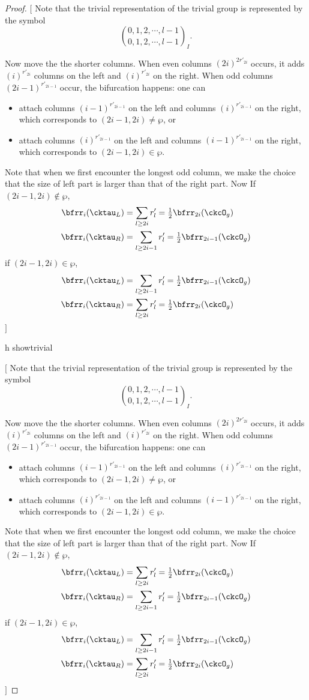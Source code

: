 \documentclass[12pt,a4paper]{amsart}
\newcommand{\trivial}[2][]{\if\relax\detokenize{#1}\relax
  {%
      \color{orange} \vspace{0em} $[$  #2 $]$
      \color{black}
  }
  \else
\ifx#1h
\ifcsname showtrivial\endcsname
{%
    \color{orange} \vspace{0em}  $[$ #2 $]$
    \color{black}
}
\fi
\else {\red Wrong argument!} \fi
\fi
}
\numberwithin{equation}{section}
\theoremstyle{remark}
\def\half{{\tfrac{1}{2}}}
\def\sP{\wp}
\begin{document}
\begin{proof}
  \trivial[]{
  Note that the trivial representation of the trivial group is represented by the symbol
  \[
    \binom{0,1, 2, \cdots, l-1}{0,1,2, \cdots, l-1}_{I}.
  \]

  Now move the the shorter columns. When even columns
  $(2i)^{2r'_{2i}}$ occurs, it adds $(i)^{r'_{2i}}$ columns on the left
  and $(i)^{r'_{2i}}$ on the right.
  When odd columns $(2i-1)^{r'_{2i-1}}$ occur,  the bifurcation
  happens: one can
  \begin{itemize}
    \item attach columns $(i-1)^{r'_{2i-1}}$ on the left and
    columns $(i)^{r'_{2i-1}}$ on the right, which corresponds to
    $(2i-1,2i)\neq \sP$, or
    \item
    attach columns $(i)^{r'_{2i-1}}$ on the left and
    columns $(i-1)^{r'_{2i-1}}$ on the right, which corresponds to
    $(2i-1,2i)\in \sP$.
  \end{itemize}
  Note that when we first encounter the longest odd column, we make the choice
  that the size of left part is larger than that of the right part.
  Now
  If $(2i-1,2i)\notin \sP$,
  \[
    \begin{split}
      \bfrr_{i}(\cktau_{L}) & = \sum_{l\geq 2i} r'_{l}
      = \half\bfrr_{2i}(\ckcO_{g})\\
      \bfrr_{i}(\cktau_{R}) & = \sum_{l\geq 2i-1} r'_{l}
      = \half\bfrr_{2i-1}(\ckcO_{g})
    \end{split}
  \]
  if $(2i-1,2i)\in \sP$,
  \[
    \begin{split}
      \bfrr_{i}(\cktau_{L}) & = \sum_{l\geq 2i-1} r'_{l}
      = \half\bfrr_{2i-1}(\ckcO_{g})\\
      \bfrr_{i}(\cktau_{R}) & = \sum_{l\geq 2i} r'_{l}
      = \half\bfrr_{2i}(\ckcO_{g})
    \end{split}
  \]
  }



\end{proof}
\end{document}
